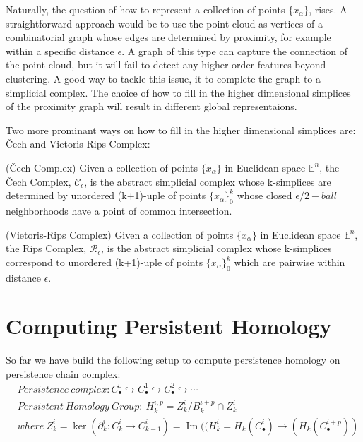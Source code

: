 \documentclass[11pt,a4paper]{report}
\DeclareMathOperator{\Ima}{Im}
\begin{document}
              Naturally, the question of how to represent a collection of points $\{x_\alpha\}$, rises. 
              A straightforward approach would be to use the point cloud as vertices of a combinatorial graph whose
              edges are determined by proximity, for example within a specific distance $\epsilon$. A graph of this type can capture the connection of the point cloud,
              but it will fail to detect any higher order features beyond clustering. 
              A good way to tackle this issue, it to complete the graph to a simplicial complex. The choice of how to fill in the higher dimensional simplices of the proximity graph will result in different global representaions. 
              
              Two more prominant ways on how to fill in the higher dimensional simplices are:  \v{C}ech and Vietoris-Rips Complex: 
              
              \begin{defn} \label{cech} (\v{C}ech Complex)
           Given a collection of points $\{x_\alpha\}$ in Euclidean space $\mathbb{E}^n$, the \v{C}ech Complex, $\mathcal{C}_\epsilon$, is the abstract simplicial complex whose k-simplices are determined by unordered (k+1)-uple of points $\{x_\alpha\}_0^k$ whose closed $\epsilon/2-ball$ neighborhoods have a point of common intersection. 
              \end{defn}
           
           \begin{defn} (Vietoris-Rips Complex)
              Given a collection of points $\{x_\alpha\}$ in Euclidean space $\mathbb{E}^n$, the Rips Complex, $\mathcal{R}_\epsilon$, is the abstract simplicial complex whose k-simplices correspond to unordered (k+1)-uple of points $\{x_\alpha\}_0^k$ which are pairwise within distance $\epsilon$. 
            \end{defn}





              
              
              
            \chapter{Computing Persistent Homology}

            So far we have build the following setup to compute persistence homology on persistence chain complex:
              \begin{align*}
                &Persistence \ complex: C_\bullet^0 \hookrightarrow C_\bullet^1 \hookrightarrow C_\bullet^2 \hookrightarrow \cdots\\
                &Persistent \ Homology \ Group: \ H_k^{i,p} = Z_k^i / B_k^{i+p} \cap Z_k^i\\
                & where \ Z_k^i = \ker (\partial_k^i : C_k^i \rightarrow C_{k-1}^i)
                =\Ima ((H_k^i = H_k ( C_\bullet^i) \rightarrow (H_k ( C_\bullet^{i+p}))\\
              \end{align*}
\end{document}
